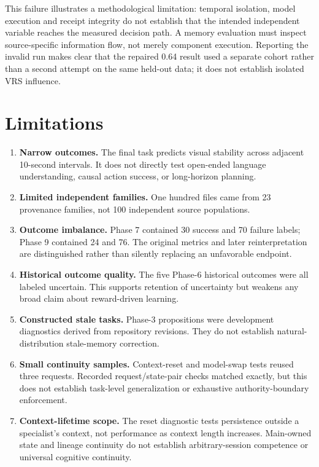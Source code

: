 \documentclass[11pt]{article}
\begin{document}
This failure illustrates a methodological limitation: temporal isolation, model execution and receipt integrity do not establish that the intended independent variable reaches the measured decision path. A memory evaluation must inspect source-specific information flow, not merely component execution. Reporting the invalid run makes clear that the repaired 0.64 result used a separate cohort rather than a second attempt on the same held-out data; it does not establish isolated VRS influence.

\section{Limitations}

\begin{enumerate}[leftmargin=1.5em]
  \item \textbf{Narrow outcomes.}  The final task predicts visual stability across adjacent 10-second intervals.  It does not directly test open-ended language understanding, causal action success, or long-horizon planning.
  \item \textbf{Limited independent families.}  One hundred files came from 23 provenance families, not 100 independent source populations.
  \item \textbf{Outcome imbalance.} Phase 7 contained 30 success and 70 failure labels; Phase 9 contained 24 and 76. The original metrics and later reinterpretation are distinguished rather than silently replacing an unfavorable endpoint.
  \item \textbf{Historical outcome quality.}  The five Phase-6 historical outcomes were all labeled uncertain.  This supports retention of uncertainty but weakens any broad claim about reward-driven learning.
  \item \textbf{Constructed stale tasks.}  Phase-3 propositions were development diagnostics derived from repository revisions.  They do not establish natural-distribution stale-memory correction.
  \item \textbf{Small continuity samples.} Context-reset and model-swap tests reused three requests. Recorded request/state-pair checks matched exactly, but this does not establish task-level generalization or exhaustive authority-boundary enforcement.
  \item \textbf{Context-lifetime scope.}  The reset diagnostic tests persistence outside a specialist's context, not performance as context length increases. Main-owned state and lineage continuity do not establish arbitrary-session competence or universal cognitive continuity.

\end{enumerate}
\end{document}
